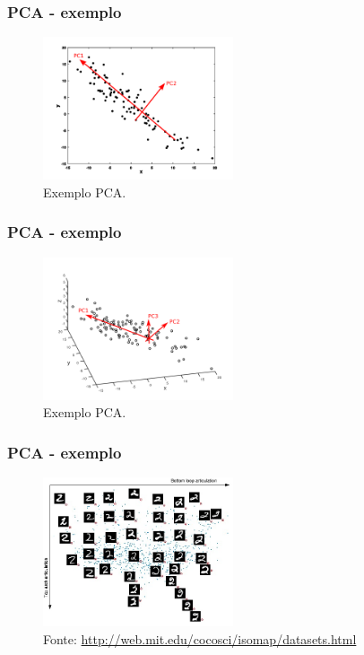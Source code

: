 \begin{frame}%
  \frametitle{PCA - exemplo}
  \begin{figure}[h!]
  \centering
  \includegraphics[width=0.5\textwidth]{images/pca_ex1.pdf}
  \caption{Exemplo PCA.}
  \label{fig:pcaex1}
  \end{figure}  
\end{frame}

\begin{frame}%
  \frametitle{PCA - exemplo}
  \begin{figure}[h!]
  \centering
  \includegraphics[width=0.5\textwidth]{images/pca_ex2.pdf}
  \caption{Exemplo PCA.}
  \label{fig:pcaex2}
  \end{figure}  
\end{frame}

\begin{frame}%
  \frametitle{PCA - exemplo}
  \begin{figure}[h!]
  \centering
  \includegraphics[width=0.5\textwidth]{images/twos.jpg}
  \caption{Fonte: \url{http://web.mit.edu/cocosci/isomap/datasets.html}}
  \label{fig:twos}
  \end{figure}
\end{frame}

